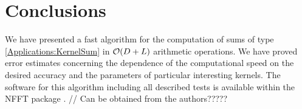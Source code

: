 \documentclass[11pt,a4paper,twoside,bibtotoc]{scrartcl}
\theoremstyle{plain}
\theoremstyle{definition}
\theoremstyle{remark}
\numberwithin{equation}{section}
\numberwithin{table}{section}
\numberwithin{figure}{section}
\begin{document}
\section{Conclusions}

We have presented a fast algorithm for the computation of sums of type
\eqref{Applications:KernelSum} in ${\cal O} (D +L)$ arithmetic operations.
We have proved error estimates concerning the dependence of the computational
speed on the desired accuracy and the parameters of particular interesting
kernels.
The software for this algorithm including all described tests is available
within the NFFT package \cite[{\tt ./example/fastsumS2}]{kupo02C}. // Can be
obtained from the authors?????



\end{document}
